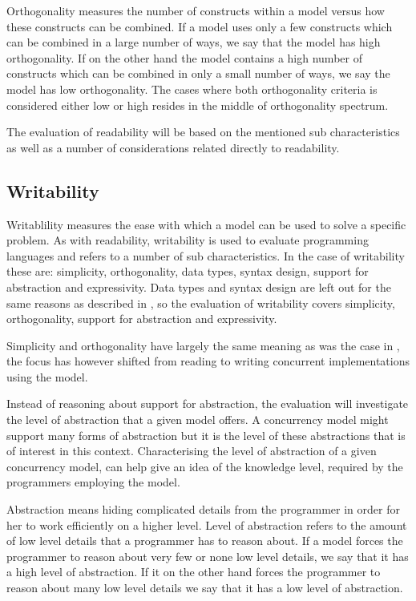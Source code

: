 Orthogonality measures the number of constructs within a model versus how these constructs can be combined\cite[p. 9]{sebestaProLang}. If a model uses only a few constructs which can be combined in a large number of ways, we say that the model has high orthogonality. If on the other hand the model contains a high number of constructs which can be combined in only a small number of ways, we say the model has low orthogonality. The cases where both orthogonality criteria is considered either low or high resides in the middle of orthogonality spectrum.

The evaluation of readability will be based on the mentioned sub characteristics as well as a number of considerations related directly to readability.

\subsection{Writability}\label{sec:writablity}
Writablility measures the ease with which a model can be used to solve a specific problem\cite[p. 13]{sebestaProLang}. As with readability, writability is used to evaluate programming languages and refers to a number of sub characteristics. In the case of writability these are: simplicity, orthogonality, data types, syntax design, support for abstraction and expressivity. Data types and syntax design are left out for the same reasons as described in , so the evaluation of writability covers simplicity, orthogonality, support for abstraction and expressivity. 

Simplicity and orthogonality have largely the same meaning as was the case in , the focus has however shifted from reading to writing concurrent implementations using the model. 

Instead of reasoning about support for abstraction, the evaluation will investigate the level of abstraction that a given model offers. A concurrency model might support many forms of abstraction but it is the level of these abstractions that is of interest in this context. Characterising the level of abstraction of a given concurrency model, can help give an idea of the knowledge level, required by the programmers employing the model.

Abstraction means hiding complicated details from the programmer in order for her to work efficiently on a higher level\cite[p. 14]{sebestaProLang}. Level of abstraction refers to the amount of low level details that a programmer has to reason about. If a model forces the programmer to reason about very few or none low level details, we say that it has a high level of abstraction. If it on the other hand forces the programmer to reason about many low level details we say that it has a low level of abstraction.

